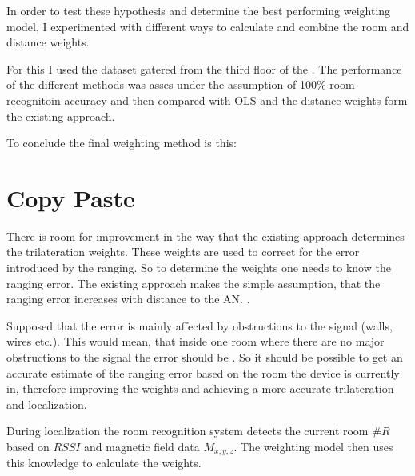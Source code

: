 In order to test these hypothesis and determine the best performing weighting model, I experimented with different ways to calculate and combine the room and distance weights.

For this I used the dataset gatered from the third floor of the . The performance of the different methods was asses under the assumption of 100\% room recognitoin accuracy and then compared with OLS and the distance weights form the existing approach.


To conclude the final weighting method is this:



\section{Copy Paste}
There is room for improvement in the way that the existing approach determines the trilateration weights. These weights are used to correct for the error introduced by the ranging. So to determine the weights one needs to know the ranging error. The existing approach makes the simple assumption, that the ranging error increases with distance to the AN. .

Supposed that the error is mainly affected by obstructions to the signal (walls, wires etc.). This would mean, that inside one room where there are no major obstructions to the signal the error should be . So it should be possible to get an accurate estimate of the ranging error based on the room the device is currently in, therefore improving the weights and achieving a more accurate trilateration and localization.

During localization the room recognition system detects the current room \(\#R\) based on \(RSSI\) and magnetic field data \(M_{x,y,z}\). The weighting model then uses this knowledge to calculate the weights. 